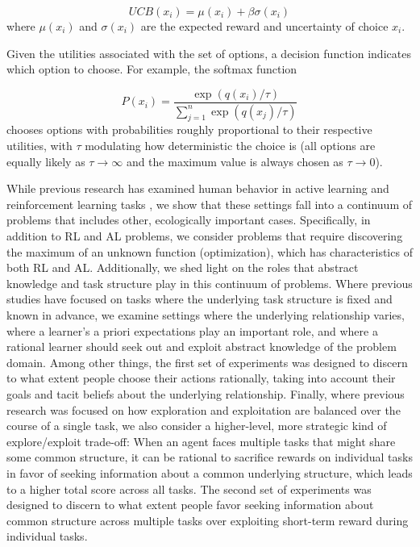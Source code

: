 \documentclass[10pt,letterpaper]{article}
\begin{document}
		$$UCB(x_{i}) = \mu(x_{i}) + \beta \sigma(x_{i}) $$
		where $\mu(x_{i})$ and $\sigma(x_{i})$ are the expected reward and uncertainty of choice $x_{i}$. 
		
		Given the utilities associated with the set of options, a decision function indicates which option to choose. For example, the softmax function \cite{Sutton1998a}
		
		$$P(x_{i})=\frac{\exp(q(x_{i})/\tau)}{\sum_{j=1}^{n}\exp(q(x_{j})/\tau)} $$
		chooses options with probabilities roughly proportional to their respective utilities, with $\tau$ modulating how deterministic the choice is (all options are equally likely as $\tau \rightarrow \infty$ and the maximum value is always chosen as $\tau \rightarrow 0$).
		
		While previous research has examined human behavior in active learning \cite{} and reinforcement learning tasks \cite{}, we show that these settings fall into a continuum of problems that includes other, ecologically important cases. Specifically, in addition to RL and AL problems, we consider problems that require discovering the maximum of an unknown function (optimization), which has characteristics of both RL and AL. Additionally, we shed light on the roles that abstract knowledge and task structure play in this continuum of problems. Where previous studies have focused on tasks where the underlying task structure is fixed and known in advance, we examine settings where the underlying relationship varies, where a learner’s a priori expectations play an important role, and where a rational learner should seek out and exploit abstract knowledge of the problem domain. Among other things, the first set of experiments was designed to discern to what extent people choose their actions rationally, taking into account their goals and tacit beliefs about the underlying relationship. Finally, where previous research was focused on how exploration and exploitation are balanced over the course of a single task, we also consider a higher-level, more strategic kind of explore/exploit trade-off: When an agent faces multiple tasks that might share some common structure, it can be rational to sacrifice rewards on individual tasks in favor of seeking information about a common underlying structure, which leads to a higher total score across all tasks. The second set of experiments was designed to discern to what extent people favor seeking information about common structure across multiple tasks over exploiting short-term reward during individual tasks.
		
\end{document}
